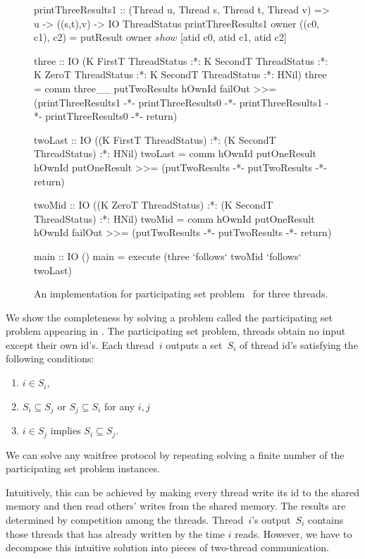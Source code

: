 \documentclass[doctor]{iscs-thesis}
\begin{document}
\begin{figure}[t]
\begin{spec}
printThreeResults1 :: (Thread u, Thread s, Thread t, Thread v) => u -> ((s,t),v) -> IO ThreadStatus
printThreeResults1 owner ((c0, c1), c2) = putResult owner $ show $ [atid c0, atid c1, atid c2]

three :: IO (K FirstT ThreadStatus :*: K SecondT ThreadStatus :*:
             K ZeroT  ThreadStatus :*: K SecondT ThreadStatus :*: HNil)
three = comm three__ putTwoResults hOwnId failOut
   >>= (printThreeResults1 -*- printThreeResults0 -*- printThreeResults1 -*- printThreeResults0 -*- return)

twoLast :: IO ((K FirstT ThreadStatus) :*: (K SecondT ThreadStatus) :*: HNil)
twoLast = comm hOwnId putOneResult hOwnId putOneResult >>= (putTwoResults -*- putTwoResults -*- return)

twoMid :: IO ((K ZeroT ThreadStatus) :*: (K SecondT ThreadStatus) :*: HNil)
twoMid = comm hOwnId putOneResult hOwnId failOut >>= (putTwoResults -*- putTwoResults -*- return)
        
main :: IO ()
main = execute (three `follows` twoMid `follows` twoLast)

\end{spec}
 \caption{An implementation for participating set problem~\citep{participating} for three
 threads.}
 \label{fig:complete}
\end{figure}


We show the completeness by solving a problem called
the participating set problem appearing in \citet{participating}.
The participating set problem, threads obtain no input except their own
id's.
Each thread~$i$ outputs a set~$S_i$ of thread id's satisfying the
following conditions:
\begin{enumerate}
 \item $i\in S_i$,
 \item $S_i\subseteq S_j$ or $S_j\subseteq S_i$ for any $i,j$
 \item $i\in S_j$ implies $S_i\subseteq S_j$.
\end{enumerate}
We can solve any waitfree protocol by repeating solving a finite number
of the participating set problem instances.

Intuitively, this can be achieved by making every thread write its id to
the shared memory and then read others' writes from the shared memory.
The results are determined by competition among the threads.
Thread~$i$'s output~$S_i$ contains those threads that has already
written by the time $i$ reads.
However, we have to decompose this intuitive solution into pieces of
two-thread communication.
\end{document}
